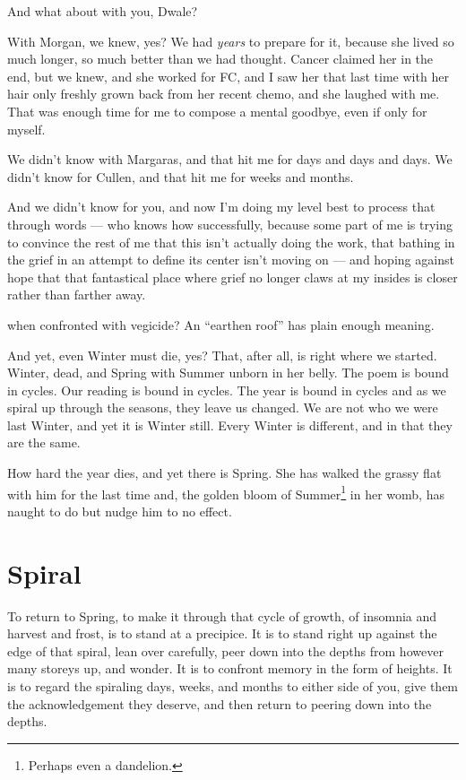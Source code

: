 \documentclass[12pt]{memoir}
\begin{document}
{And what about with you, Dwale?\par
With Morgan, we knew, yes? We had \emph{years} to prepare for it, because she lived so much longer, so much better than we had thought. Cancer claimed her in the end, but we knew, and she worked for FC, and I saw her that last time with her hair only freshly grown back from her recent chemo, and she laughed with me. That was enough time for me to compose a mental goodbye, even if only for myself.\par
We didn't know with Margaras, and that hit me for days and days and days. We didn't know for Cullen, and that hit me for weeks and months.\par
And we didn't know for you, and now I'm doing my level best to process that through words --- who knows how successfully, because some part of me is trying to convince the rest of me that this isn't actually doing the work, that bathing in the grief in an attempt to define its center isn't moving on --- and hoping against hope that that fantastical place where grief no longer claws at my insides is closer rather than farther away.} when confronted with vegicide? An ``earthen roof'' has plain enough meaning.

And yet, even Winter must die, yes? That, after all, is right where we started. Winter, dead, and Spring with Summer unborn in her belly. The poem is bound in cycles. Our reading is bound in cycles. The year is bound in cycles and as we spiral up through the seasons, they leave us changed. We are not who we were last Winter, and yet it is Winter still. Every Winter is different, and in that they are the same.

How hard the year dies, and yet there is Spring. She has walked the grassy flat with him for the last time and, the golden bloom of Summer\footnote{Perhaps even a dandelion.} in her womb, has naught to do but nudge him to no effect.


\clearpage

\section*{Spiral}

To return to Spring, to make it through that cycle of growth, of insomnia and harvest and frost, is to stand at a precipice. It is to stand right up against the edge of that spiral, lean over carefully, peer down into the depths from however many storeys up, and wonder. It is to confront memory in the form of heights. It is to regard the spiraling days, weeks, and months to either side of you, give them the acknowledgement they deserve, and then return to peering down into the depths.
\end{document}
